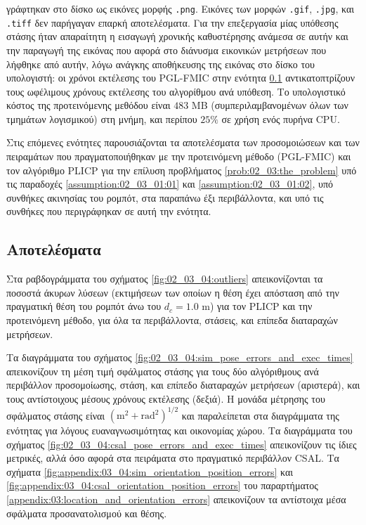 γράφτηκαν στο δίσκο ως εικόνες μορφής \texttt{.png}. Εικόνες των μορφών
\texttt{.gif}, \texttt{.jpg}, και \texttt{.tiff} δεν παρήγαγαν επαρκή
αποτελέσματα.  Για την επεξεργασία μίας υπόθεσης στάσης ήταν απαραίτητη η
εισαγωγή χρονικής καθυστέρησης ανάμεσα σε αυτήν και την παραγωγή της εικόνας
που αφορά στο διάνυσμα εικονικών μετρήσεων που λήφθηκε από αυτήν, λόγω ανάγκης
αποθήκευσης της εικόνας στο δίσκο του υπολογιστή: οι χρόνοι εκτέλεσης του
PGL-FMIC στην ενότητα \ref{subsection:02_03_04:02} αντικατοπτρίζουν τους
ωφέλιμους χρόνους εκτέλεσης του αλγορίθμου ανά υπόθεση. Το υπολογιστικό κόστος
της προτεινόμενης μεθόδου είναι $483$ MB (συμπεριλαμβανομένων όλων των τμημάτων
λογισμικού) στη μνήμη, και περίπου $25\%$ σε χρήση ενός πυρήνα CPU.

Στις επόμενες ενότητες παρουσιάζονται τα αποτελέσματα των προσομοιώσεων και των
πειραμάτων που πραγματοποιήθηκαν με την προτεινόμενη μέθοδο (PGL-FMIC) και τον
αλγόριθμο PLICP για την επίλυση προβλήματος \ref{prob:02_03:the_problem} υπό
τις παραδοχές \ref{assumption:02_03_01:01} και \ref{assumption:02_03_01:02},
υπό συνθήκες ακινησίας του ρομπότ, στα παραπάνω έξι περιβάλλοντα, και υπό τις
συνθήκες που περιγράφηκαν σε αυτή την ενότητα.

\subsection{Αποτελέσματα}
\label{subsection:02_03_04:02}

Στα ραβδογράμματα του σχήματος \ref{fig:02_03_04:outliers} απεικονίζονται τα
ποσοστά άκυρων λύσεων (εκτιμήσεων των οποίων η θέση έχει απόσταση από την
πραγματική θέση του ρομπότ άνω του $d_c = 1.0$ m) για τον PLICP και την
προτεινόμενη μέθοδο, για όλα τα περιβάλλοντα, στάσεις, και επίπεδα διαταραχών
μετρήσεων.

Τα διαγράμματα του σχήματος \ref{fig:02_03_04:sim_pose_errors_and_exec_times}
απεικονίζουν τη μέση τιμή σφάλματος στάσης για τους δύο αλγόριθμους
ανά περιβάλλον προσομοίωσης, στάση, και επίπεδο διαταραχών μετρήσεων
(αριστερά), και τους αντίστοιχους μέσους χρόνους εκτέλεσης (δεξιά). Η μονάδα
μέτρησης του σφάλματος στάσης είναι $(\text{m}^2 + \text{rad}^2)^{1/2}$ και
παραλείπεται στα διαγράμματα της ενότητας για λόγους ευαναγνωσιμότητας και
οικονομίας χώρου. Τα διαγράμματα του σχήματος
\ref{fig:02_03_04:csal_pose_errors_and_exec_times} απεικονίζουν τις ίδιες
μετρικές, αλλά όσο αφορά στα πειράματα στο πραγματικό περιβάλλον CSAL.
Τα σχήματα \ref{fig:appendix:03_04:sim_orientation_position_errors} και
\ref{fig:appendix:03_04:csal_orientation_position_errors} του παραρτήματος
\ref{appendix:03:location_and_orientation_errors} απεικονίζουν τα αντίστοιχα
μέσα σφάλματα προσανατολισμού και θέσης.

